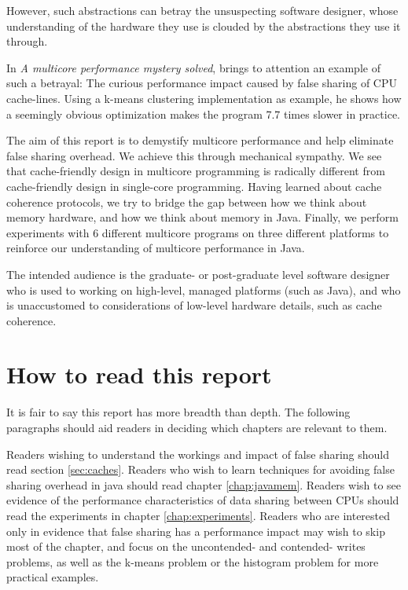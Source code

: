 However, such abstractions can betray the unsuspecting software designer, whose
understanding of the hardware they use is clouded by the abstractions they use
it through.

In \textit{A multicore performance mystery solved}\cite{mystery},
\citeauthor{mystery} brings to attention an example of such a betrayal: The
curious performance impact caused by false sharing of CPU cache-lines. Using a
k-means clustering implementation as example, he shows how a seemingly obvious
optimization makes the program 7.7 times slower in practice.

The aim of this report is to demystify multicore performance and help eliminate
false sharing overhead. We achieve this through mechanical sympathy. We see that
cache-friendly design in multicore programming is radically different from
cache-friendly design in single-core programming. Having learned about cache
coherence protocols, we try to bridge the gap between how we think about memory
hardware, and how we think about memory in Java. Finally, we perform experiments
with 6 different multicore programs on three different platforms to reinforce our
understanding of multicore performance in Java.

The intended audience is the graduate- or post-graduate level software designer
who is used to working on high-level, managed platforms (such as Java), and who
is unaccustomed to considerations of low-level hardware details, such as cache
coherence.

\chapter{How to read this report}
It is fair to say this report has more breadth than depth. The following
paragraphs should aid readers in deciding which chapters are relevant to them.

Readers wishing to understand the workings and impact of false sharing should
read section \ref{sec:caches}. Readers who wish to learn techniques for avoiding
false sharing overhead in java should read chapter \ref{chap:javamem}. Readers
wish to see evidence of the performance characteristics of data sharing between
CPUs should read the experiments in chapter \ref{chap:experiments}. Readers who
are interested only in evidence that false sharing has a performance impact may
wish to skip most of the chapter, and focus on the uncontended- and contended-
writes problems, as well as the k-means problem or the histogram problem for
more practical examples.

